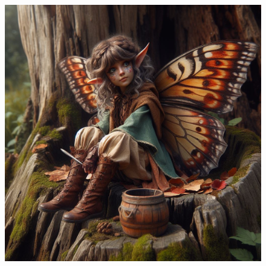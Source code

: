 \begin{figure}[h]
\begin{center}
\includegraphics[scale=0.30]{img/ai-images/pixie.jpeg}
\end{center}
\end{figure}
